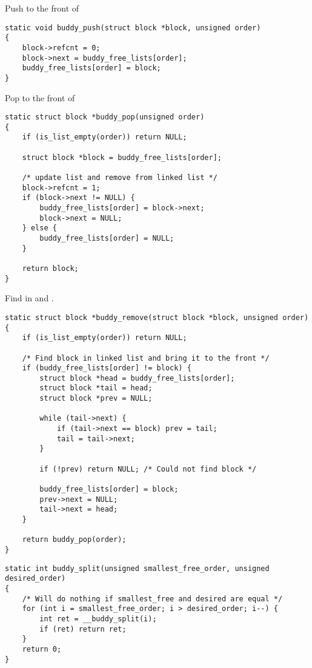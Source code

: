 \newpar{}

Push to the front of 
\begin{lstlisting}[style=bright_C++]
static void buddy_push(struct block *block, unsigned order)
{
    block->refcnt = 0;
    block->next = buddy_free_lists[order];
    buddy_free_lists[order] = block;
}
\end{lstlisting}

\newpar{}

Pop to the front of 
\begin{lstlisting}[style=bright_C++]
static struct block *buddy_pop(unsigned order)
{
    if (is_list_empty(order)) return NULL;

    struct block *block = buddy_free_lists[order];

    /* update list and remove from linked list */
    block->refcnt = 1;
    if (block->next != NULL) {
        buddy_free_lists[order] = block->next;
        block->next = NULL;
    } else {
        buddy_free_lists[order] = NULL;
    }

    return block;
}
\end{lstlisting}

\newpar{}

Find  in   and .
\begin{lstlisting}[style=bright_C++]
static struct block *buddy_remove(struct block *block, unsigned order)
{
	if (is_list_empty(order)) return NULL;

	/* Find block in linked list and bring it to the front */
	if (buddy_free_lists[order] != block) {
		struct block *head = buddy_free_lists[order];
		struct block *tail = head;
		struct block *prev = NULL;

		while (tail->next) {
			if (tail->next == block) prev = tail;
			tail = tail->next;
		}

		if (!prev) return NULL; /* Could not find block */

		buddy_free_lists[order] = block;
		prev->next = NULL;
		tail->next = head;
	}

	return buddy_pop(order);
}
\end{lstlisting}

\newpar{}
\begin{lstlisting}[style=bright_C++]
static int buddy_split(unsigned smallest_free_order, unsigned desired_order)
{
	/* Will do nothing if smallest_free and desired are equal */
	for (int i = smallest_free_order; i > desired_order; i--) {
		int ret = __buddy_split(i);
		if (ret) return ret;
	}
	return 0;
}
\end{lstlisting}

